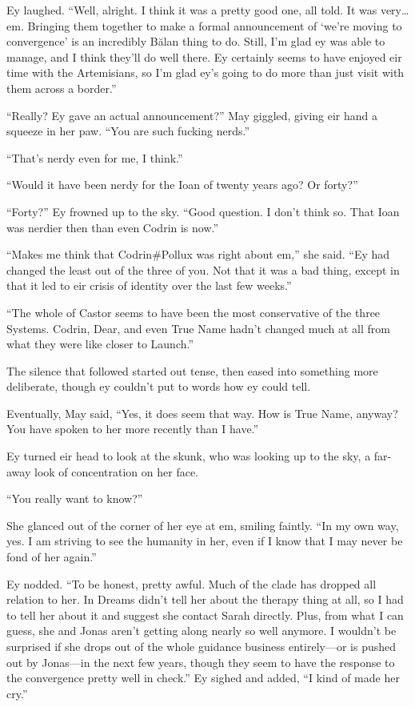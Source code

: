 Ey laughed. ``Well, alright. I think it was a pretty good one, all told. It was very\ldots em. Bringing them together to make a formal announcement of `we're moving to convergence' is an incredibly Bălan thing to do. Still, I'm glad ey was able to manage, and I think they'll do well there. Ey certainly seems to have enjoyed eir time with the Artemisians, so I'm glad ey's going to do more than just visit with them across a border.''

``Really? Ey gave an actual announcement?'' May giggled, giving eir hand a squeeze in her paw. ``You are such fucking nerds.''

``That's nerdy even for me, I think.''

``Would it have been nerdy for the Ioan of twenty years ago? Or forty?''

``Forty?'' Ey frowned up to the sky. ``Good question. I don't think so. That Ioan was nerdier then than even Codrin is now.''

``Makes me think that Codrin\#Pollux was right about em,'' she said. ``Ey had changed the least out of the three of you. Not that it was a bad thing, except in that it led to eir crisis of identity over the last few weeks.''

``The whole of Castor seems to have been the most conservative of the three Systems. Codrin, Dear, and even True Name hadn't changed much at all from what they were like closer to Launch.''

The silence that followed started out tense, then eased into something more deliberate, though ey couldn't put to words how ey could tell.

Eventually, May said, ``Yes, it does seem that way. How is True Name, anyway? You have spoken to her more recently than I have.''

Ey turned eir head to look at the skunk, who was looking up to the sky, a far-away look of concentration on her face.

``You really want to know?''

She glanced out of the corner of her eye at em, smiling faintly. ``In my own way, yes. I am striving to see the humanity in her, even if I know that I may never be fond of her again.''

Ey nodded. ``To be honest, pretty awful. Much of the clade has dropped all relation to her. In Dreams didn't tell her about the therapy thing at all, so I had to tell her about it and suggest she contact Sarah directly. Plus, from what I can guess, she and Jonas aren't getting along nearly so well anymore. I wouldn't be surprised if she drops out of the whole guidance business entirely—or is pushed out by Jonas—in the next few years, though they seem to have the response to the convergence pretty well in check.'' Ey sighed and added, ``I kind of made her cry.''

